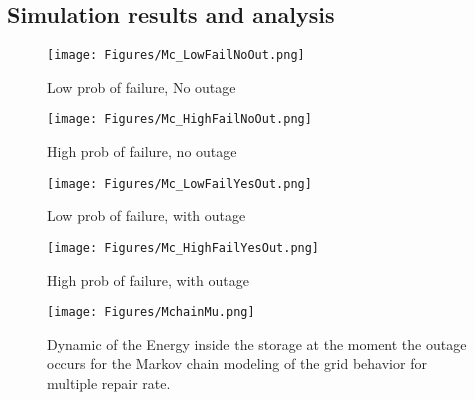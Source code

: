 \documentclass[conference]{IEEEtran}
\begin{document}
 
 \subsection{Simulation results and analysis}
 
 \begin{figure*}[!ht]
  
    \begin{minipage}{.49\linewidth}
       
        \texttt{[image: Figures/Mc\_LowFailNoOut.png]}
        \caption{Low prob of failure, No outage}
        \label{fig:LOwFailNoOut}    
    \end{minipage}%
    \begin{minipage}{.01\linewidth}
      \hspace{1px}
    \end{minipage}%
    \begin{minipage}{0.49\linewidth}
        \texttt{[image: Figures/Mc\_HighFailNoOut.png]}
        \caption{High prob of failure, no outage}
        \label{fig:HighFailNoOut}
    \end{minipage}
\end{figure*}

\begin{figure*}[!ht]
    \begin{minipage}{.49\linewidth}
        \texttt{[image: Figures/Mc\_LowFailYesOut.png]}
        \caption{Low prob of failure, with outage}
        \label{fig:LOwFailYesOut}    
    \end{minipage}%
    \begin{minipage}{.01\linewidth}
      \hspace{1px}
    \end{minipage}%
    \begin{minipage}{0.49\linewidth}
        \texttt{[image: Figures/Mc\_HighFailYesOut.png]} 
        \caption{High prob of failure, with outage}
        \label{fig:HighFailYesOut}
    \end{minipage}
\end{figure*}

 \begin{figure}[!htb]
        \begin{center}
                \texttt{[image: Figures/MchainMu.png]}
        \end{center}
        \caption{Dynamic of the Energy inside the storage at the moment the outage occurs for the Markov chain modeling of the grid behavior for multiple repair rate.
        }
        \label{fig:MarchainVar}
\end{figure} 
\end{document}
